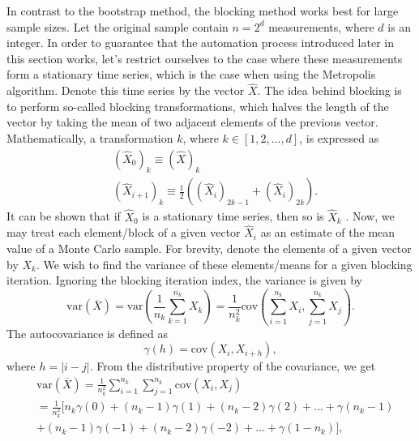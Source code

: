 \documentclass[
    a4paper, aps, twocolumn, floatfix, superscriptaddress,
    nofootinbib]{revtex4-1}
\begin{document}
In contrast to the bootstrap method, the blocking method works best for large sample sizes. Let the original sample contain $n=2^d$ measurements, where $d$ is an integer. In order to guarantee that the automation process introduced later in this section works, let's restrict ourselves to the case where these measurements form a stationary time series, which is the case when using the Metropolis algorithm. Denote this time series by the vector $\hat{X}$. The idea behind blocking is to perform so-called blocking transformations, which halves the length of the vector by taking the mean of two adjacent elements of the previous vector. Mathematically, a transformation $k$, where $k \in [1, 2, ..., d]$, is expressed as
\begin{align}
    &(\hat X_0)_k \equiv (\hat X)_k \nonumber\\
    &(\hat X_{i+1})_k \equiv \frac{1}{2}((\hat X_i)_{2k-1} + (\hat X_i)_{2k}). \label{eq:blocking_transformation}
\end{align}
 It can be shown that if $\hat{X}_0$ is a stationary time series, then so is $\hat{X}_k$ \cite{Jonsson}. Now, we may treat each element/block of a given vector $\hat{X}_i$ as an estimate of the mean value of a Monte Carlo sample. For brevity, denote the elements of a given vector by $X_k$. We wish to find the variance of these elements/means for a given blocking iteration. Ignoring the blocking iteration index, the variance is given by \cite{Jonsson}
 \begin{equation}
     \text{var}(\overline{X}) = \text{var}\left(\frac{1}{n_k} \sum_{k=1}^{n_k} X_k \right) = \frac{1}{n_k^2} \text{cov}\left( \sum_{i=1}^{n_k} X_i, \sum_{j=1}^{n_k} X_j \right).
 \end{equation}
The autocovariance is defined as 
 \begin{equation}
     \gamma(h) = \text{cov}(X_i,X_{i+h}),
 \end{equation}
where $h = |i-j|$. From the distributive property of the covariance, we get 
 \begin{align}
     &\text{var}(\overline{X}) = \frac{1}{n_k^2}\sum_{i=1}^{n_k}\sum_{j=1}^{n_k} \text{cov}(X_i,X_j)\\ \nonumber
     & = \frac{1}{n_k^2}\Big[n_k\gamma(0) + (n_k-1)\gamma(1) + (n_k-2)\gamma(2)+...+\gamma(n_k-1)\\ \nonumber
     & + (n_k-1) \gamma(-1) + (n_k-2) \gamma(-2) +...+\gamma(1-n_k)\Big],
 \end{align}
\end{document}
